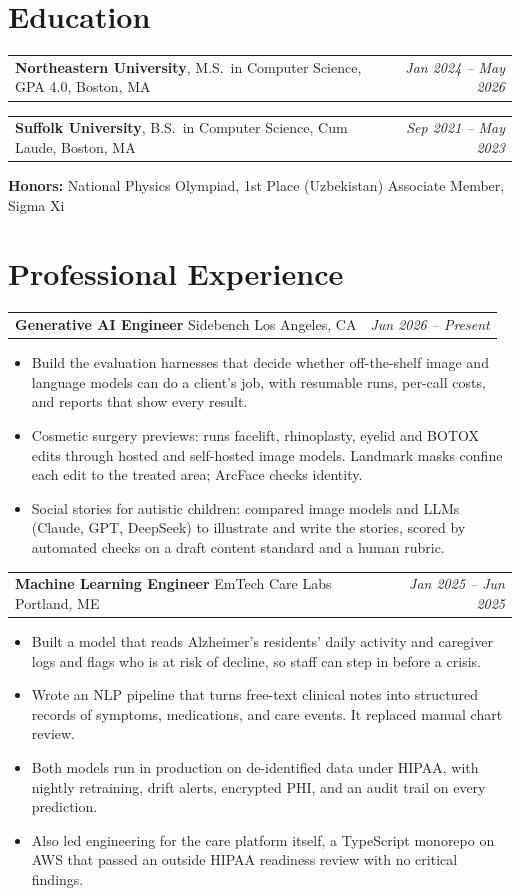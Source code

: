 \documentclass[letterpaper,11pt]{article}
\makeatletter
\newcommand{\educationEntry}[4]{%
    \vspace{2pt}\noindent
    \begin{tabular*}{\textwidth}{@{}l@{\extracolsep{\fill}}r@{}}
        \textbf{\color{accent}#1}, {\color{darktext}#2}, {\color{lighttext}#3} & \textit{\color{lighttext}#4} \\
    \end{tabular*}\par\vspace{-1pt}
}
\newcommand{\experienceEntry}[4]{%
    \vspace{3pt}\noindent
    \begin{tabular*}{\textwidth}{@{}l@{\extracolsep{\fill}}r@{}}
        \textbf{\color{darktext}#1} {\color{lighttext}\textbar} {\color{accent}#2} {\color{lighttext}\textbar} {\color{lighttext}#3} & \textit{\color{lighttext}#4} \\
    \end{tabular*}\vspace{-4pt}
}
\makeatother
\begin{document}
\section{Education}
\educationEntry{Northeastern University}{M.S.\ in Computer Science, GPA 4.0}{Boston, MA}{Jan 2024 -- May 2026}
\educationEntry{Suffolk University}{B.S.\ in Computer Science, Cum Laude}{Boston, MA}{Sep 2021 -- May 2023}
\vspace{3pt}\noindent
{\small\color{lighttext}\textbf{Honors:} National Physics Olympiad, 1st Place (Uzbekistan) \enspace\textperiodcentered\enspace Associate Member, Sigma Xi}

\section{Professional Experience}

\experienceEntry{Generative AI Engineer}{Sidebench}{Los Angeles, CA}{Jun 2026 -- Present}
\begin{itemize}
    \item Build the evaluation harnesses that decide whether off-the-shelf image and language models can do a client's job, with resumable runs, per-call costs, and reports that show every result.
    \item Cosmetic surgery previews: runs facelift, rhinoplasty, eyelid and BOTOX edits through hosted and self-hosted image models. Landmark masks confine each edit to the treated area; ArcFace checks identity.
    \item Social stories for autistic children: compared image models and LLMs (Claude, GPT, DeepSeek) to illustrate and write the stories, scored by automated checks on a draft content standard and a human rubric.
\end{itemize}

\experienceEntry{Machine Learning Engineer}{EmTech Care Labs}{Portland, ME}{Jan 2025 -- Jun 2025}
\begin{itemize}
    \item Built a model that reads Alzheimer's residents' daily activity and caregiver logs and flags who is at risk of decline, so staff can step in before a crisis.
    \item Wrote an NLP pipeline that turns free-text clinical notes into structured records of symptoms, medications, and care events. It replaced manual chart review.
    \item Both models run in production on de-identified data under HIPAA, with nightly retraining, drift alerts, encrypted PHI, and an audit trail on every prediction.
    \item Also led engineering for the care platform itself, a TypeScript monorepo on AWS that passed an outside HIPAA readiness review with no critical findings.
\end{itemize}
\end{document}
